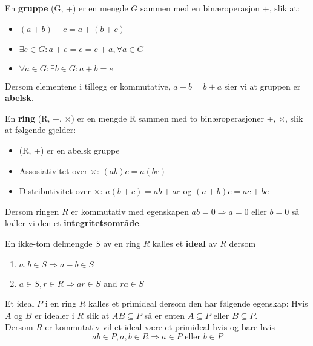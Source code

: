 

\begin{definisjon}
En \textbf{gruppe} (G, +) er en mengde $G$ sammen med en binæroperasjon $+$, slik at:
\begin{itemize}[noitemsep]
    \item $(a+b) + c = a + (b + c)$
    \item $ \exists e \in G: a+e = e = e+a,  \forall a \in G $
    \item $\forall a \in G: \exists b \in G: a + b = e$
\end{itemize}
Dersom elementene i tillegg er kommutative, $a +b = b + a$ sier vi at gruppen er \textbf{abelsk}.
\end{definisjon}

\begin{definisjon}
En \textbf{ring} (R, +, $\times$) er en mengde R sammen med to binæroperasjoner +, $\times$, slik at følgende gjelder:
\begin{itemize}[noitemsep]
    \item (R, +) er en abelsk gruppe
    \item Assosiativitet over $\times$: $(ab)c = a(bc)$
    \item Distributivitet over $\times$: $a(b + c) = ab + ac$ og $(a+b)c = ac + bc$
\end{itemize}
Dersom ringen $R$ er kommutativ med egenskapen $ab=0 \Rightarrow a = 0 \text{ eller } b = 0$ så kaller vi den et \textbf{integritetsområde}.
\end{definisjon}

\begin{definisjon}
En ikke-tom delmengde $S$ av en ring $R$ kalles et \textbf{ideal} av $R$ dersom 
\begin{enumerate}[noitemsep]
    \item $a,b \in S \Rightarrow a-b \in S$
    \item $a \in S, r \in R \Rightarrow ar \in S$ and $ra \in S$
\end{enumerate}
\end{definisjon}

\begin{definisjon}
Et ideal $P$ i en ring $R$ kalles et primideal dersom den har følgende egenskap: Hvis $A$ og $B$ er idealer i $R$ slik at $AB \subseteq P$ så er enten $A \subseteq P$ eller $B \subseteq P$. \\
Dersom $R$ er kommutativ vil et ideal være et primideal hvis og bare hvis $$
ab \in P, a,b \in R \Rightarrow a \in P \text{ eller } b \in P
$$
\end{definisjon}

